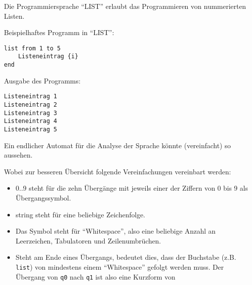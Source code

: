 \documentclass[fontsize=10pt, a4paper, ngerman]{scrartcl}
\begin{document}
\ReiheTitel

\begin{aufgabe}[subtitle=list 1.0]
	\label{aufg:list-v1}
	Die Programmiersprache \enquote{LIST} erlaubt das Programmieren von
	nummerierten Listen.

	\begin{minipage}[t]{.5\textwidth}
	Beispielhaftes Programm in \enquote{LIST}:
	\begin{verbatim}
list from 1 to 5
    Listeneintrag {i}
end
	\end{verbatim}
	\end{minipage}\hfill\begin{minipage}[t]{.5\textwidth}
	Ausgabe des Programms:
	\begin{verbatim}
Listeneintrag 1
Listeneintrag 2
Listeneintrag 3
Listeneintrag 4
Listeneintrag 5
	\end{verbatim}
	\end{minipage}

	Ein endlicher Automat für die Analyse der Sprache könnte (vereinfacht) so aussehen.

	\begin{center}
		\rmfamily\small
		\begin{transitiongraph}[fa]

		\end{transitiongraph}
	\end{center}

	Wobei zur besseren Übersicht folgende Vereinfachungen vereinbart werden:
	\begin{itemize}
		\item {\rmfamily\small 0..9} steht für die zehn Übergänge mit jeweils einer der Ziffern von 0 bis
			9 als Übergangssymbol.
		\item {\rmfamily\small string} steht für eine beliebige Zeichenfolge.
		\item Das Symbol {\rmfamily\textvisiblespace} steht für \enquote{Whitespace}, also eine
			beliebige Anzahl an Leerzeichen, Tabulatoren und Zeilenumbrüchen.
		\item Steht {\rmfamily\textvisiblespace} am Ende eines Übergangs, bedeutet dies, dass der
			Buchstabe (z.B. \texttt{list}) von mindestens einem \enquote{Whitespace} gefolgt werden
			muss. Der Übergang von \texttt{q0} nach \texttt{q1} ist also eine Kurzform von



\end{itemize}
\end{aufgabe}
\end{document}
